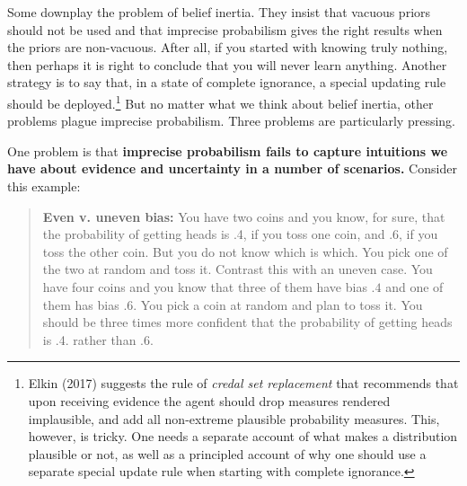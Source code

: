 \documentclass[
  10pt,
  dvipsnames,enabledeprecatedfontcommands]{scrartcl}
\begin{document}
Some downplay the problem of belief inertia. They insist that vacuous
priors should not be used and that imprecise probabilism gives the right
results when the priors are non-vacuous. After all, if you started with
knowing truly nothing, then perhaps it is right to conclude that you
will never learn anything. Another strategy is to say that, in a state
of complete ignorance, a special updating rule should be
deployed.\footnote{Elkin (2017) suggests the rule of
  \emph{credal set replacement} that recommends that upon receiving
  evidence the agent should drop measures rendered implausible, and add
  all non-extreme plausible probability measures. This, however, is
  tricky. One needs a separate account of what makes a distribution
  plausible or not, as well as a principled account of why one should
  use a separate special update rule when starting with complete
  ignorance.} But no matter what we think about belief inertia, other
problems plague imprecise probabilism. Three problems are particularly
pressing.

One problem is that \textbf{imprecise probabilism fails to capture
intuitions we have about evidence and uncertainty in a number of
scenarios.} Consider this example:

\begin{quote}
\textbf{Even v. uneven bias:}
 You have two coins and you know, for sure, that the probability of getting heads is .4, if you toss one coin, and .6, if you toss the other coin. But you do not know which is which. You pick one of the two at random and toss it.  Contrast this with an uneven case. You have four coins and you know that three of them have bias $.4$ and one of them has bias $.6$. You pick a coin at random and plan to toss it. You should be three times more confident that the probability of getting heads is .4. rather than .6.
\end{quote}
\end{document}
